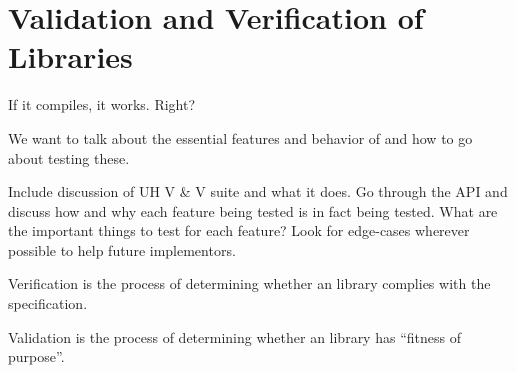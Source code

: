 %
% 
% 
% 
% 
% 
% 
%

\chapter{Validation and Verification of \openshmem Libraries}

If it compiles, it works.  Right?

We want to talk about the essential features and behavior
of \openshmem and how to go about testing these.

Include discussion of UH V \& V suite and what it does.  Go through
the API and discuss how and why each feature being tested is in fact
being tested.  What are the important things to test for each feature?
Look for edge-cases wherever possible to help future implementors.

\begin{description}

\item Verification is the process of determining whether an \openshmem
  library complies with the specification.

\item Validation is the process of determining whether an \openshmem
  library has ``fitness of purpose''.

\end{description}
